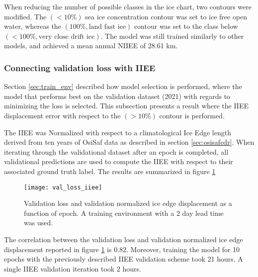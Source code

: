 \documentclass[../main/thesis]{subfiles}
\begin{document}
When reducing the number of possible classes in the ice chart, two contours were modified. The $(< 10\%)$ sea ice concentration contour was set to ice free open water, whereas the $(100\%, \text{land fast ice})$ contour was set to the class below $(< 100\%, \text{very close drift ice})$. The model was still trained similarly to other models, and achieved a mean annual NIIEE of 28.61 km.  

\subsubsection{Connecting validation loss with IIEE}
Section \ref{sec:train_env} described how model selection is performed, where the model that performs best on the validation dataset (2021) with regards to minimizing the loss is selected. This subsection presents a result where the IIEE displacement error \citep{Goessling2016, Melsom2019} with respect to the $(>10\%)$ contour is performed. 

The IIEE was Normalized with respect to a climatological Ice Edge length derived from ten years of OsiSaf data as described in section \ref{sec:osisafcdr}. When iterating through the validational dataset after an epoch is completed, all validational predictions are used to compute the IIEE with respect to their associated ground truth label. The results are summarized in figure \ref{fig:val_loss_iiee}

\begin{figure}
    \centering
    \texttt{[image: val\_loss\_iiee]}
    \caption{\label{fig:val_loss_iiee}Validation loss and validation normalized ice edge displacement as a function of epoch. A training environment with a 2 day lead time was used.}
\end{figure}

The correlation between the validation loss and validation normalized ice edge displacement reported in figure \ref{fig:val_loss_iiee} is 0.82. Moreover, training the model for 10 epochs with the previously described IIEE validation scheme took 21 hours. A single IIEE validation iteration took 2 hours. 

\biblio
\end{document}
